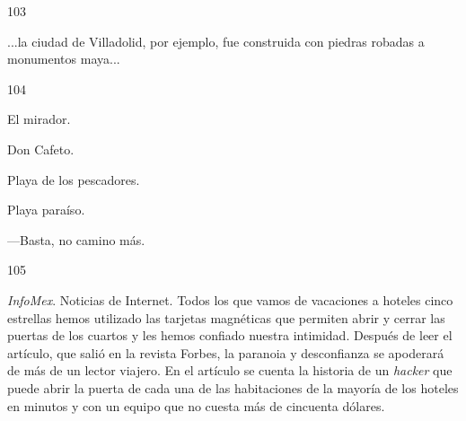 \documentclass[12pt,twoside,openright,a5paper]{book}
\begin{document}
\vspace{0.5cm}

\hrulefill \hspace{0.1cm}\decofourleft\hspace{0.2cm} 103 \hspace{0.2cm}\decofourright \hspace{0.1cm}\hrulefill

\nopagebreak

\vspace{0.5cm}

\nopagebreak

...la ciudad de Villadolid, por ejemplo,
fue construida con piedras robadas a monumentos maya...


\vspace{0.5cm}

\hrulefill \hspace{0.1cm}\decofourleft\hspace{0.2cm} 104 \hspace{0.2cm}\decofourright \hspace{0.1cm}\hrulefill

\nopagebreak

\vspace{0.5cm}

\nopagebreak

El mirador.

Don Cafeto.

Playa de los pescadores.

Playa paraíso.

---Basta, no camino más.

\vspace{0.5cm}
\afterpage{}
\hrulefill \hspace{0.1cm}\decofourleft\hspace{0.2cm} 105 \hspace{0.2cm}\decofourright \hspace{0.1cm}\hrulefill

\nopagebreak

\vspace{0.5cm}

\nopagebreak

\emph{InfoMex}. Noticias de Internet. Todos los que vamos de vacaciones a hoteles
cinco estrellas hemos utilizado las tarjetas magnéticas que permiten
abrir y cerrar las puertas de los cuartos y les hemos confiado nuestra
intimidad. Después de leer el artículo, que salió en la revista Forbes,
la paranoia y desconfianza se apoderará de más de un lector viajero. En
el artículo se cuenta la historia de un \emph{hacker} que puede abrir la puerta
de cada una de las habitaciones de la mayoría de los hoteles en minutos
y con un equipo que no cuesta más de cincuenta dólares.
\end{document}
